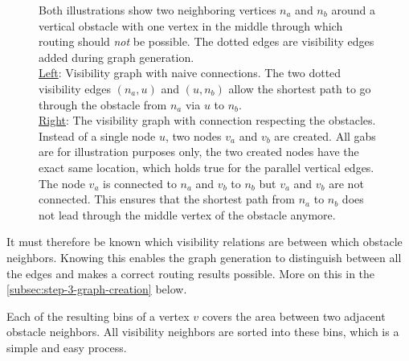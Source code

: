 \begin{figure}[h]
\begin{figcenter}
					\end{figcenter}
					\caption{
						Both illustrations show two neighboring vertices $n_a$ and $n_b$ around a vertical obstacle with one vertex in the middle through which routing should \emph{not} be possible.
						The dotted edges are visibility edges added during graph generation.
						\\
						\underline{Left}:
						Visibility graph with naive connections.
						The two dotted visibility edges $(n_a, u)$ and $(u, n_b)$ allow the shortest path to go through the obstacle from $n_a$ via $u$ to $n_b$.
						\\
						\underline{Right}:
						The visibility graph with connection respecting the obstacles. Instead of a single node $u$, two nodes $v_a$ and $v_b$ are created.
						All gabs are for illustration purposes only, the two created nodes have the exact same location, which holds true for the parallel vertical edges.
						The node $v_a$ is connected to $n_a$ and $v_b$ to $n_b$ but $v_a$ and $v_b$ are not connected.
						This ensures that the shortest path from $n_a$ to $n_b$ does not lead through the middle vertex of the obstacle anymore.
					}
					\label{fig:routing-through-line-obstacle}
				\end{figure}
				
				It must therefore be known which visibility relations are between which obstacle neighbors.
				Knowing this enables the graph generation to distinguish between all the edges and makes a correct routing results possible.
				More on this in the \cref{subsec:step-3-graph-creation} below.
				
				Each of the resulting bins of a vertex $v$ covers the area between two adjacent obstacle neighbors.
				All visibility neighbors are sorted into these bins, which is a simple and easy process.
				
